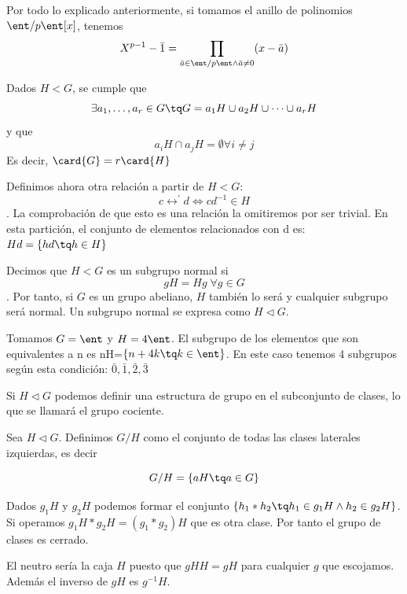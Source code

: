 \documentclass[nochap]{apuntes}
\begin{document}
  \begin{example}
   Por todo lo explicado anteriormente, si tomamos el anillo de polinomios $\ent/p\ent[x]$, tenemos \[ X^{p-1}-\bar{1}=
   \prod_{\bar{a}\in\ent/p\ent \wedge \bar{a}\neq 0}(x-\bar{a}) \]
  \end{example}
  
  \begin{theorem}
   Dados $H<G$,  se cumple que \[ \exists a_{1},\dotsc,a_{r}\in G\tq G=a_{1}H \cup a_{2}H \cup \dotsb \cup a_{r}H\] y que \[ a_{i}H\cap a_{j}H=\emptyset \forall i\neq j\] 
   Es decir, $\card{G}=r\card{H}$
  \end{theorem}

  Definimos ahora otra relación a partir de $H<G$: \[ c\rel^{'}d \Leftrightarrow cd^{-1}\in H \]. La comprobación de que esto es una relación
  la omitiremos por ser trivial. En esta partición, el conjunto de elementos relacionados con d es: $Hd=\{hd\tq h\in H\}$
  
  \begin{defn}
   Decimos que $H<G$  es un subgrupo normal si \[ gH=Hg \; \forall g \in G \]. Por tanto, si $G$ es un grupo abeliano, $H$ también lo será y cualquier  subgrupo será normal. Un subgrupo normal se expresa como $H\lhd G$.
  \end{defn}
  
  \begin{example}
   Tomamos $G=\ent$  y $H=4\ent$. 
   El subgrupo de los elementos que son equivalentes a n es nH=$\{n+4k\tq k \in \ent\}$.
   En este caso tenemos 4 subgrupos según esta condición: $\bar{0},\bar{1},\bar{2},\bar{3}$
  \end{example}
  
  Si $H\lhd G$  podemos definir una estructura de grupo en el subconjunto de clases, lo que se llamará el grupo cociente.
  
  \begin{defn} Sea $H \lhd G$. Definimos $G / H$ como el conjunto de todas las clases laterales izquierdas, es decir
  
  \[ G/H = \{ aH \tq a \in G\} \]
  \end{defn}
  
  
  Dados $g_{1}H$  y $g_{2}H$  podemos formar el conjunto $\{h_{1}\ast h_{2}\tq h_{1}\in g_{1}H \wedge h_{2}\in g_{2}H\}$. Si operamos   $g_{1}H\ast g_{2}H=(g_{1}\ast g_{2})H$  que es otra clase. Por tanto el grupo de clases es cerrado.
  
  El neutro sería la caja $H$ puesto que $gHH=gH$ para cualquier $g$ que escojamos. Además el inverso de $gH$ es $g^{-1}H$.
  
\end{document}
